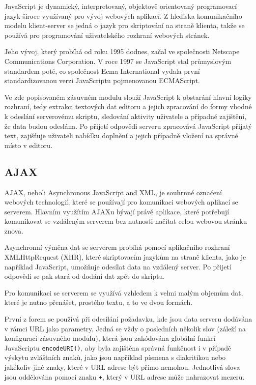 \documentclass[a4paper,11pt]{article}
\begin{document}
JavaScript je dynamický, interpretovaný, objektově orientovaný programovací jazyk široce využívaný pro vývoj webových aplikací. Z hlediska komunikačního modelu klient-server se jedná o jazyk pro skriptování na straně klienta, takže se používá pro programování uživatelského rozhraní webových stránek. %


Jeho vývoj, který probíhá od roku 1995 dodnes, začal ve společnosti Netscape Communications Corporation. V roce 1997 se JavaScript stal průmyslovým standardem poté, co společnost Ecma International vydala první standardizovanou verzi JavaScriptu pojmenovanou ECMAScript. %

Ve zde popisovaném zásuvném modulu slouží JavaScript k obstarání hlavní logiky rozhraní, tedy extrakci textových dat editoru a jejich zpracování do formy vhodné k odeslání serverovému skriptu, sledování aktivity uživatele a případné zajištění, že data budou odeslána. Po přijetí odpovědi serveru zpracovává JavaScript přijatý text, zajišťuje uživateli nabídku doplnění a jejich případně vložení na správné místo v editoru. 

\subsection{AJAX}

AJAX, neboli Asynchronous JavaScript and XML, je souhrnné označení webových technologií, které se používají pro komunikaci webových aplikací se serverem. Hlavním využítím AJAXu bývají právě aplikace, které potřebují komunikovat se vzdáleným serverem bez nutnosti načítat celou webovou stránku znova. 

Asynchronní výměna dat se serverem probíhá pomocí aplikačního rozhraní XMLHttpRequest (XHR), které skriptovacím jazykům na straně klienta, jako je například JavaScript, umožňuje odesílat data na vzdálený server. Po přijetí odpovědi se pak stará od dodání dat zpět do skriptu.

Pro komunikaci se serverem se využívá vzhledem k velmi malým objemům dat, které je nutno přenášet, prostého textu, a to ve dvou formách. 

První z forem se používá při odesílání požadavku, kde jsou data serveru dodávána v rámci URL jako parametry. Jedná se vždy o posledních několik slov (záleží na konfiguraci zásuvného modulu), která jsou zakódována globální funkcí JavaScriptu {\tt encodeURI()}, aby byla zajištěna správná funkčnost i v případě výskytu zvláštních znaků, jako jsou například písmena s diakritikou nebo jakékoliv jiné znaky, které v URL adrese být přímo nemohou. Jednotlivá slova jsou oddělována pomocí znaku {\tt +}, který v URL adrese může nahrazovat mezeru.
\end{document}
